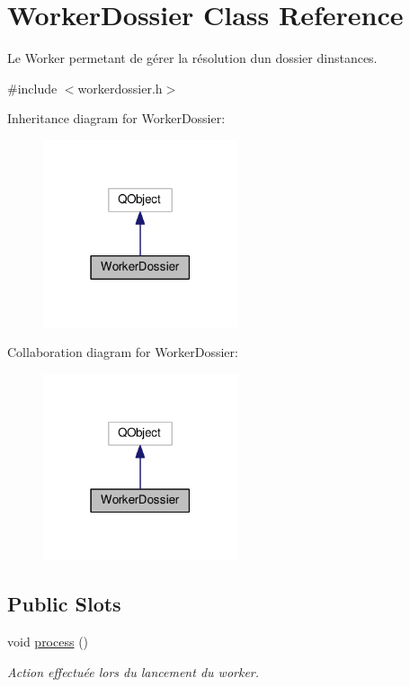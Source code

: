 \hypertarget{classWorkerDossier}{}\section{Worker\+Dossier Class Reference}
\label{classWorkerDossier}


Le Worker permetant de gérer la résolution d\textquotesingle{}un dossier d\textquotesingle{}instances.  




{\ttfamily \#include $<$workerdossier.\+h$>$}



Inheritance diagram for Worker\+Dossier\+:\nopagebreak
\begin{figure}[H]
\begin{center}
\leavevmode
\includegraphics[width=162pt]{classWorkerDossier__inherit__graph}
\end{center}
\end{figure}


Collaboration diagram for Worker\+Dossier\+:\nopagebreak
\begin{figure}[H]
\begin{center}
\leavevmode
\includegraphics[width=162pt]{classWorkerDossier__coll__graph}
\end{center}
\end{figure}
\subsection*{Public Slots}
\begin{DoxyCompactItemize}
\item 
void \hyperlink{classWorkerDossier_a2e2970df6c43c669eb730a858a780a31}{process} ()
\begin{DoxyCompactList}\small\item\em Action effectuée lors du lancement du worker. \end{DoxyCompactList}\end{DoxyCompactItemize}
